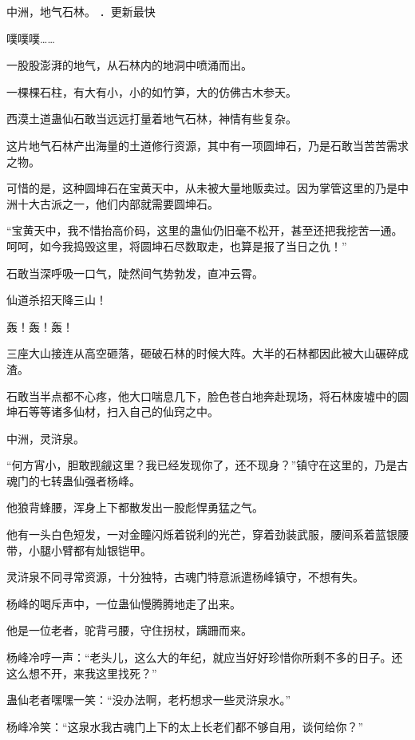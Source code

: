 
\begin{this_body}

中洲，地气石林。 ．更新最快

噗噗噗……

一股股澎湃的地气，从石林内的地洞中喷涌而出。

一棵棵石柱，有大有小，小的如竹笋，大的仿佛古木参天。

西漠土道蛊仙石敢当远远打量着地气石林，神情有些复杂。

这片地气石林产出海量的土道修行资源，其中有一项圆坤石，乃是石敢当苦苦需求之物。

可惜的是，这种圆坤石在宝黄天中，从未被大量地贩卖过。因为掌管这里的乃是中洲十大古派之一，他们内部就需要圆坤石。

“宝黄天中，我不惜抬高价码，这里的蛊仙仍旧毫不松开，甚至还把我挖苦一通。呵呵，如今我捣毁这里，将圆坤石尽数取走，也算是报了当日之仇！”

石敢当深呼吸一口气，陡然间气势勃发，直冲云霄。

仙道杀招天降三山！

轰！轰！轰！

三座大山接连从高空砸落，砸破石林的时候大阵。大半的石林都因此被大山碾碎成渣。

石敢当半点都不心疼，他大口喘息几下，脸色苍白地奔赴现场，将石林废墟中的圆坤石等等诸多仙材，扫入自己的仙窍之中。

中洲，灵浒泉。

“何方宵小，胆敢觊觎这里？我已经发现你了，还不现身？”镇守在这里的，乃是古魂门的七转蛊仙强者杨峰。

他狼背蜂腰，浑身上下都散发出一股彪悍勇猛之气。

他有一头白色短发，一对金瞳闪烁着锐利的光芒，穿着劲装武服，腰间系着蓝银腰带，小腿小臂都有灿银铠甲。

灵浒泉不同寻常资源，十分独特，古魂门特意派遣杨峰镇守，不想有失。

杨峰的喝斥声中，一位蛊仙慢腾腾地走了出来。

他是一位老者，驼背弓腰，守住拐杖，蹒跚而来。

杨峰冷哼一声：“老头儿，这么大的年纪，就应当好好珍惜你所剩不多的日子。还这么想不开，来我这里找死？”

蛊仙老者嘿嘿一笑：“没办法啊，老朽想求一些灵浒泉水。”

杨峰冷笑：“这泉水我古魂门上下的太上长老们都不够自用，谈何给你？”


\end{this_body}
